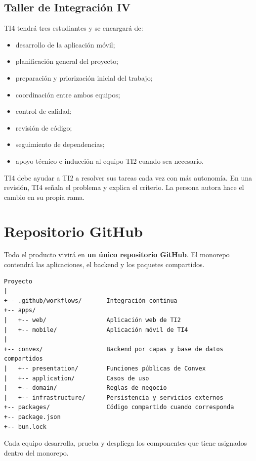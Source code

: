 \documentclass[11pt,a4paper]{article}
\begin{document}
\subsection{Taller de Integración IV}

TI4 tendrá tres estudiantes y se encargará de:

\begin{itemize}
  \item desarrollo de la aplicación móvil;
  \item planificación general del proyecto;
  \item preparación y priorización inicial del trabajo;
  \item coordinación entre ambos equipos;
  \item control de calidad;
  \item revisión de código;
  \item seguimiento de dependencias;
  \item apoyo técnico e inducción al equipo TI2 cuando sea necesario.
\end{itemize}

TI4 debe ayudar a TI2 a resolver sus tareas cada vez con más autonomía. En una
revisión, TI4 señala el problema y explica el criterio. La persona autora hace
el cambio en su propia rama.


\section{Repositorio GitHub}

Todo el producto vivirá en \textbf{un único repositorio GitHub}. El monorepo
contendrá las aplicaciones, el backend y los paquetes compartidos.

\begin{lstlisting}
Proyecto
|
+-- .github/workflows/       Integración continua
+-- apps/
|   +-- web/                 Aplicación web de TI2
|   +-- mobile/              Aplicación móvil de TI4
|
+-- convex/                  Backend por capas y base de datos compartidos
|   +-- presentation/        Funciones públicas de Convex
|   +-- application/         Casos de uso
|   +-- domain/              Reglas de negocio
|   +-- infrastructure/      Persistencia y servicios externos
+-- packages/                Código compartido cuando corresponda
+-- package.json
+-- bun.lock
\end{lstlisting}

Cada equipo desarrolla, prueba y despliega los componentes que tiene asignados
dentro del monorepo.
\end{document}
